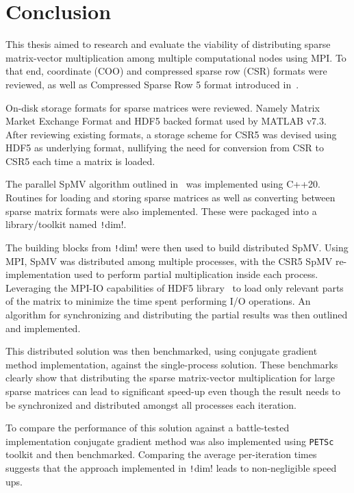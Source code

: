 \documentclass[thesis=M,english]{FITthesis}[2019/12/23]
\newcommand{\csre}[1]{\texttt!#1!}
\begin{document}
\chapter{Conclusion}

This thesis aimed to research and evaluate the viability of distributing sparse matrix-vector multiplication
among multiple computational nodes using MPI\@. To that end, coordinate (COO) and compressed sparse row (CSR) formats
were reviewed, as well as Compressed Sparse Row 5 format introduced in~\cite{liu2015csr5}.

On-disk storage formats for sparse matrices were reviewed. Namely Matrix Market Exchange Format
and HDF5 backed format used by MATLAB v7.3. After reviewing existing formats, a storage scheme for CSR5 was 
devised
using HDF5 as underlying format, nullifying the need for conversion from CSR to CSR5 each time a matrix
is loaded.

The parallel SpMV algorithm outlined in~\cite{liu2015csr5} was implemented using C++20. Routines for
loading and storing sparse matrices as well as converting between sparse matrix formats were
also implemented. These were packaged into a library/toolkit named \csre{dim}.

The building blocks from \csre{dim} were then used to build distributed SpMV\@. Using MPI, SpMV was
distributed among multiple processes, with the CSR5 SpMV re-implementation used to perform partial
multiplication inside each process. Leveraging the MPI-IO capabilities of HDF5 library~\cite{hdf5} to load only
relevant parts of the matrix to minimize the time spent performing I/O operations. An algorithm for
synchronizing and distributing the partial results was then outlined and implemented.

This distributed solution was then benchmarked, using conjugate gradient method implementation, against the
single-process solution. These benchmarks clearly show that distributing the sparse matrix-vector multiplication
for large sparse matrices can lead to significant speed-up even though the result needs to be synchronized
and distributed amongst all processes each iteration.

To compare the performance of this solution against a battle-tested implemen\-tation conjugate gradient method
was also implemented using \texttt{PETSc} toolkit and then benchmarked. Comparing the average per-iteration times
suggests that the approach implemented in \csre{dim} leads to non-negligible speed ups.
\end{document}
